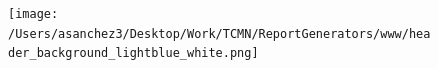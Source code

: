 \documentclass{article}\usepackage[]{graphicx}\usepackage[]{color}
\begin{document}
%

\begin{figure}
  \vspace{-3ex} %
\end{figure}

\begin{figure}
  \vspace{-1ex} %
  \texttt{[image: /Users/asanchez3/Desktop/Work/TCMN/ReportGenerators/www/header\_background\_lightblue\_white.png]}
\end{figure}
\end{document}
